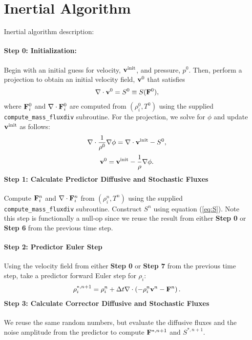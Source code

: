 \documentclass[final]{siamltex}
\def\Fb {{\bf F}}
\def\vb {{\bf v}}
\begin{document}
\section{Inertial Algorithm}
Inertial algorithm description:\\ \\
{\bf Step 0: Initialization:}\\ \\
Begin with an initial guess for velocity, $\vb^{\rm init}$, and pressure, $p^0$.
Then, perform a projection to obtain an initial velocity field, $\vb^0$ that satisfies
\begin{equation}
\nabla\cdot\vb^0 = S^0 \equiv S(\Fb^0),
\end{equation}
where $\Fb_i^0$ and $\nabla\cdot\Fb_i^0$ are computed from $(\rho_i^0,T^0)$ using the 
supplied {\tt compute\_mass\_fluxdiv} subroutine.
For the projection, we solve for $\phi$ and update $\vb^{\rm init}$ as follows:
\begin{equation}
\nabla\cdot\frac{1}{\rho^0}\nabla\phi = \nabla\cdot\vb^{\rm init} - S^0,
\end{equation}
\begin{equation}
\vb^0 = \vb^{\rm init} - \frac{1}{\rho}\nabla\phi.
\end{equation}
{\bf Step 1: Calculate Predictor Diffusive and Stochastic Fluxes}\\ \\
Compute $\Fb_i^n$ and $\nabla\cdot\Fb_i^n$ from $(\rho_i^n,T^n)$ using the supplied 
{\tt compute\_mass\_fluxdiv} subroutine.  Construct $S^n$ using equation (\ref{eq:S}).
Note this step is functionally a null-op since we reuse the result from 
either {\bf Step 0} or {\bf Step 6} from the previous time step.\\ \\
{\bf Step 2: Predictor Euler Step}\\ \\
Using the velocity field from either {\bf Step 0} or {\bf Step 7} from the previous
time step, take a predictor forward Euler step for $\rho_i$:
\begin{equation}
\rho_i^{*,n+1} = \rho_i^n + \Delta t\nabla\cdot\left(-\rho_i^n\vb^n - \Fb^n\right).
\end{equation}
{\bf Step 3: Calculate Corrector Diffusive and Stochastic Fluxes}\\ \\
We reuse the same random numbers, but evaluate the diffusive fluxes and the noise amplitude from the predictor
to compute $\Fb^{*,n+1}$ and $S^{*,n+1}$.\\ \\
\end{document}
